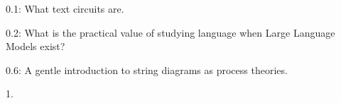 0.1: What text circuits are.

0.2: What is the practical value of studying language when Large Language Models exist?


0.6: A gentle introduction to string diagrams as process theories.



1. 